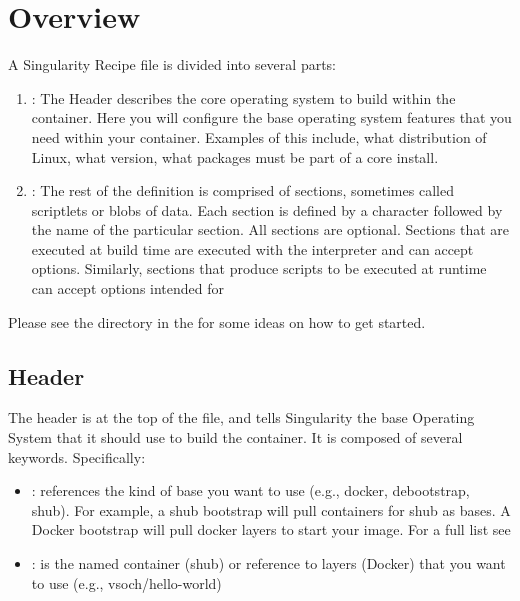 \documentclass[letterpaper,10pt,english]{sphinxmanual}
\begin{document}
\section{Overview}
\label{\detokenize{container_recipes:overview}}
A Singularity Recipe file is divided into several parts:
\begin{enumerate}
\item {} 
: The Header describes the core operating system to build
within the container. Here you will configure the base operating
system features that you need within your container. Examples of this
include, what distribution of Linux, what version, what packages must
be part of a core install.

\item {} 
: The rest of the definition is comprised of sections,
sometimes called scriptlets or blobs of data. Each section is defined
by a \sphinxcode{\sphinxupquote{\%}} character followed by the name of the particular section. All
sections are optional. Sections that are executed at build time are
executed with the  interpreter and can accept  options. Similarly,
sections that produce scripts to be executed at runtime can accept
options intended for 

\end{enumerate}

\begin{DUlineblock}{0em}
\item[] Please see the {\hyperref[\detokenize{container_recipes:examples}]{}} directory in the 
for some ideas on how to get started.
\end{DUlineblock}


\subsection{Header}
\label{\detokenize{container_recipes:header}}
The header is at the top of the file, and tells Singularity the base
Operating System that it should use to build the container. It is
composed of several keywords. Specifically:
\begin{itemize}
\item {} 
: references the kind of base you want to use (e.g., docker,
debootstrap, shub). For example, a shub bootstrap will pull
containers for shub as bases. A Docker bootstrap will pull docker
layers to start your image. For a full list see {\hyperref[\detokenize{build_a_container:build-a-container}]{}}

\item {} 
: is the named container (shub) or reference to layers (Docker) that
you want to use (e.g., vsoch/hello-world)

\end{itemize}
\end{document}
